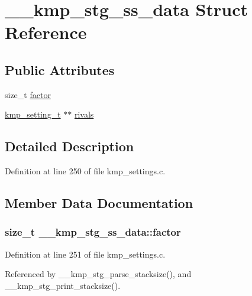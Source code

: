\hypertarget{struct____kmp__stg__ss__data}{\section{\-\_\-\-\_\-kmp\-\_\-stg\-\_\-ss\-\_\-data Struct Reference}
\label{struct____kmp__stg__ss__data}
}
\subsection*{Public Attributes}
\begin{DoxyCompactItemize}
\item 
size\-\_\-t \hyperlink{struct____kmp__stg__ss__data_a7e86bc6e0bf95b8ba0f70c0cdfe6e7e3}{factor}
\item 
\hyperlink{kmp__settings_8c_a77bbb2b0026d9ec5b857e91c44872932}{kmp\-\_\-setting\-\_\-t} $\ast$$\ast$ \hyperlink{struct____kmp__stg__ss__data_a8e22789ecbb533e293ba7c5fac124c9e}{rivals}
\end{DoxyCompactItemize}


\subsection{Detailed Description}


Definition at line 250 of file kmp\-\_\-settings.\-c.



\subsection{Member Data Documentation}
\hypertarget{struct____kmp__stg__ss__data_a7e86bc6e0bf95b8ba0f70c0cdfe6e7e3}{
\subsubsection[{factor}]{\setlength{\rightskip}{0pt plus 5cm}size\-\_\-t \-\_\-\-\_\-kmp\-\_\-stg\-\_\-ss\-\_\-data\-::factor}}\label{struct____kmp__stg__ss__data_a7e86bc6e0bf95b8ba0f70c0cdfe6e7e3}


Definition at line 251 of file kmp\-\_\-settings.\-c.



Referenced by \-\_\-\-\_\-kmp\-\_\-stg\-\_\-parse\-\_\-stacksize(), and \-\_\-\-\_\-kmp\-\_\-stg\-\_\-print\-\_\-stacksize().


